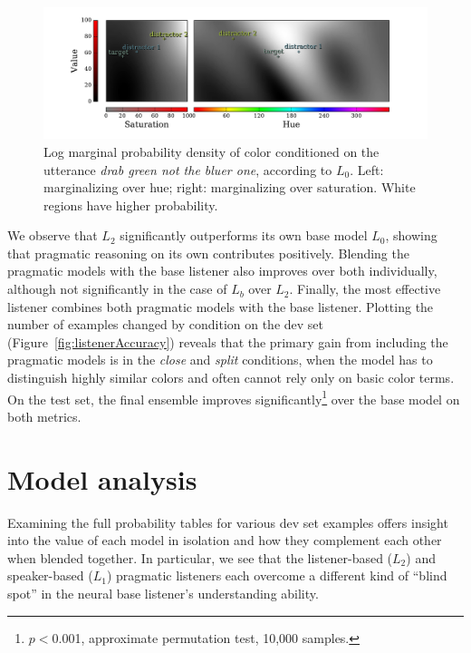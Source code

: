 \documentclass[11pt,letterpaper]{article}
\newcommand{\word}{\textit}
\newcommand{\Listener}{L}
\renewcommand{\|}{\mid}
\newcommand{\figref}[1]{Figure~\ref{#1}}
\newcommand{\cond}{\emph}
\begin{document}
\begin{figure}[t]
\centering
\includegraphics[trim={2cm 0.5cm 2.5cm 0},clip,width = \textwidth]{figures/gaussian}
\caption{Log marginal probability density of color conditioned on the utterance 
\word{drab green not the bluer one}, according to $\Listener_0$. Left: marginalizing
over hue; right: marginalizing over saturation. White regions have
higher probability.}
\label{fig:gaussian}
\end{figure}

We observe that
$\Listener_2$ significantly outperforms its own base model $\Listener_0$,
showing that pragmatic reasoning on its own contributes positively. Blending the
pragmatic models with the base listener also improves over both individually,
although not significantly in the case of $\Listener_b$ over $\Listener_2$.
Finally, the
most effective listener combines both pragmatic models with the base listener.
Plotting the number of examples changed by condition on the dev set
(\figref{fig:listenerAccuracy}) reveals that
the primary gain from including the pragmatic models is in the
\cond{close} and \cond{split} conditions, when the
model has to distinguish highly similar colors and
often cannot rely only on basic color terms.
On the test set, the final ensemble improves
significantly\footnote{$p <{}$0.001, approximate
permutation test, 10,000 samples.} over the base model on both metrics.

\section{Model analysis}

Examining the full probability tables for various dev set examples offers insight
into the value of each model in isolation and how they complement each other when
blended together. In particular, we see that the listener-based ($\Listener_2$)
and speaker-based ($\Listener_1$) pragmatic listeners each overcome a different
kind of ``blind spot'' in the neural base listener's understanding ability.
\end{document}
